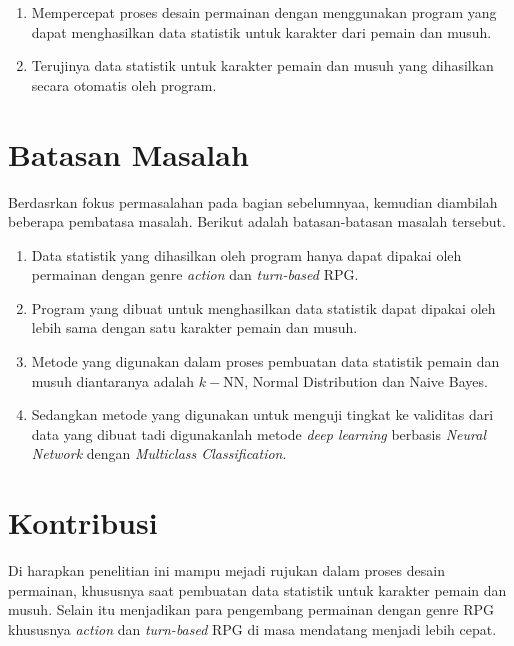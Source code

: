 \begin{enumerate}
	\item Mempercepat proses desain permainan dengan menggunakan program yang dapat menghasilkan data statistik untuk karakter dari pemain dan musuh.

	\item Terujinya data statistik untuk karakter pemain dan musuh yang dihasilkan secara otomatis oleh program.
\end{enumerate}

\section{Batasan Masalah}
\vspace{1ex}

Berdasrkan fokus permasalahan pada bagian sebelumnyaa, kemudian diambilah beberapa pembatasa masalah. Berikut adalah batasan-batasan masalah tersebut.

\begin{enumerate}
	\item Data statistik yang dihasilkan oleh program hanya dapat dipakai oleh permainan dengan genre \textit{action} dan \textit{turn-based} RPG.
	
	\item Program yang dibuat untuk menghasilkan data statistik dapat dipakai oleh lebih sama dengan satu karakter pemain dan musuh.

	\item Metode yang digunakan dalam proses pembuatan data statistik pemain dan musuh diantaranya adalah $k-$NN, Normal Distribution dan Naive Bayes.
	
	\item Sedangkan metode yang digunakan untuk menguji tingkat ke validitas dari data yang dibuat tadi digunakanlah metode \textit{deep learning} berbasis \textit{Neural Network} dengan \textit{Multiclass Classification}.
\end{enumerate}

\section{Kontribusi}
\vspace{1ex}

Di harapkan penelitian ini mampu mejadi rujukan dalam proses desain permainan, khususnya saat pembuatan data statistik untuk karakter pemain dan musuh. Selain itu menjadikan para pengembang permainan dengan genre RPG khususnya \textit{action} dan \textit{turn-based} RPG di masa mendatang menjadi lebih cepat.
